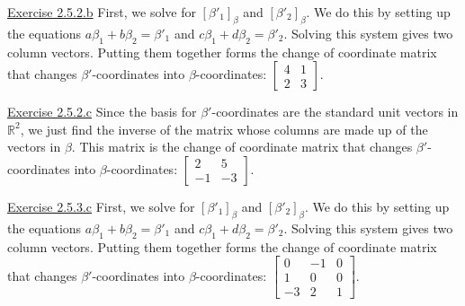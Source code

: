 \documentclass{exam}
\begin{document}
\underline{Exercise 2.5.2.b}
\newline
\newline
First, we solve for $[\beta'_1]_\beta$ and $[\beta'_2]_\beta$. We do this by setting up the equations $a\beta_1+b\beta_2=\beta'_1$ and $c\beta_1+d\beta_2=\beta'_2$. Solving this system gives two column vectors. Putting them together forms the change of coordinate matrix that changes $\beta'$-coordinates into $\beta$-coordinates: $
\begin{bmatrix}
    4 & 1 \\
    2 & 3
\end{bmatrix}$.

\underline{Exercise 2.5.2.c}
\newline
\newline
Since the basis for $\beta'$-coordinates are the standard unit vectors in $\mathbb{R}^2$, we just find the inverse of the matrix whose columns are made up of the vectors in $\beta$. This matrix is the change of coordinate matrix that changes $\beta'$-coordinates into $\beta$-coordinates: $
\begin{bmatrix}
    2 & 5 \\
    -1 & -3
\end{bmatrix}$.

\underline{Exercise 2.5.3.c}
\newline
\newline
First, we solve for $[\beta'_1]_\beta$ and $[\beta'_2]_\beta$. We do this by setting up the equations $a\beta_1+b\beta_2=\beta'_1$ and $c\beta_1+d\beta_2=\beta'_2$. Solving this system gives two column vectors. Putting them together forms the change of coordinate matrix that changes $\beta'$-coordinates into $\beta$-coordinates: $
\begin{bmatrix}
    0 & -1 & 0 \\
    1 & 0 & 0 \\
    -3 & 2 & 1
\end{bmatrix}$.
\newline
\end{document}
